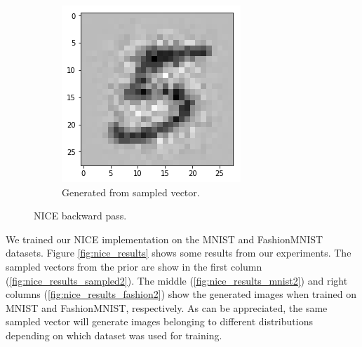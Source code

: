 \begin{figure}[htbp!]
\begin{subfigure}[b]{0.45\textwidth}
         \includegraphics[width=\textwidth]{Images/generated.png}
         \caption{Generated from sampled vector.}
         \label{fig:nice_generated}
     \end{subfigure}
        \caption{NICE backward pass.}
        \label{fig:nice_backward}
\end{figure}

We trained our NICE implementation on the MNIST and FashionMNIST datasets. Figure \ref{fig:nice_results} shows some results from our experiments. The sampled vectors from the prior are show in the first column (\ref{fig:nice_results_sampled2}). The middle (\ref{fig:nice_results_mnist2}) and right columns (\ref{fig:nice_results_fashion2}) show the generated images when trained on MNIST and FashionMNIST, respectively. As can be appreciated, the same sampled vector will generate images belonging to different distributions depending on which dataset was used for training.

